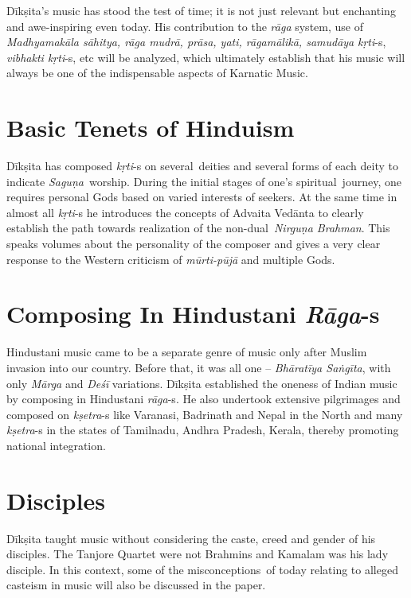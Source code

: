 Dīkṣita’s music has stood the test of time; it is not just relevant but enchanting and awe-inspiring even today. His contribution to the \textit{rāga} system, use of \textit{Madhyamakāla sāhitya, rāga mudrā, prāsa, yati, rāgamālikā, samudāya} \textit{kṛti}-s, \textit{vibhakti kṛti}-s, etc will be analyzed, which ultimately establish that his music will always be one of the indispensable aspects of Karnatic Music.


\section*{Basic Tenets of Hinduism}

Dīkṣita has composed \textit{kṛti}-s on several deities and several forms of each deity to indicate \textit{Saguṇa} worship. During the initial stages of one’s spiritual journey, one requires personal Gods based on varied interests of seekers. At the same time in almost all \textit{kṛti}-s he introduces the concepts of Advaita Vedānta to clearly establish the path towards realization of the non-dual \textit{Nirguṇa Brahman}. This speaks volumes about the personality of the composer and gives a very clear response to the Western criticism of \textit{mūrti-pūjā} and multiple Gods.


\section*{Composing In Hindustani \textit{Rāga}-s}

Hindustani music came to be a separate genre of music only after Muslim invasion into our country. Before that, it was all one – \textit{Bhāratīya Saṅgīta}, with only \textit{Mārga} and \textit{Deśī} variations. Dīkṣita established the oneness of Indian music by composing in Hindustani \textit{rāga}-s. He also undertook extensive pilgrimages and composed on \textit{kṣetra}-s like Varanasi, Badrinath and Nepal in the North and many \textit{kṣetra}-s in the states of Tamilnadu, Andhra Pradesh, Kerala, thereby promoting national integration.


\section*{Disciples}

Dīkṣita taught music without considering the caste, creed and gender of his disciples. The Tanjore Quartet were not Brahmins and Kamalam was his lady disciple. In this context, some of the misconceptions of today relating to alleged casteism in music will also be discussed in the paper.


